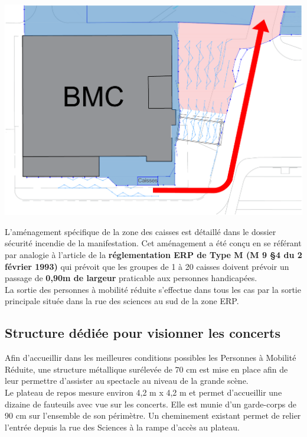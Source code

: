 \documentclass[hidelinks, paper=a4, fontsize=13pt]{report}
\begin{document}
\begin{center}
\includegraphics[width=.8\textwidth,keepaspectratio]{Exports/Plan_24h_44eme-Entree_PMR}
\end{center}

L’aménagement spécifique de la zone des caisses est détaillé dans le dossier sécurité incendie de la manifestation. Cet aménagement a été conçu en se référant par analogie à l’article de la \textbf{réglementation ERP de Type M (M 9 §4 du 2 février 1993)} qui prévoit que les groupes de 1 à 20 caisses doivent prévoir un passage de \textbf{0,90m de largeur} praticable aux personnes handicapées. \\

La sortie des personnes à mobilité réduite s’effectue dans tous les cas par la sortie principale située dans la rue des sciences au sud de la zone ERP.

\subsection{Structure dédiée pour visionner les concerts}

Afin d’accueillir dans les meilleures conditions possibles les Personnes à Mobilité Réduite, une structure métallique surélevée de 70 cm est mise en place afin de leur permettre d’assister au spectacle au niveau de la grande scène.\\

Le plateau de repos mesure environ 4,2 m x 4,2 m et permet d’accueillir une dizaine de fauteuils avec vue sur les concerts. Elle est munie d’un garde-corps de 90 cm sur l’ensemble de son périmètre. 
Un cheminement existant permet de relier l'entrée depuis la rue des Sciences à la rampe d'accès au plateau.\\
\end{document}
